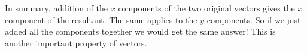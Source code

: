           
          
          \label{m38819*id194071}\nopagebreak\noindent{}
    
          
          
        \par 
        \label{m38819*id194227}In summary, addition of the \begin{math}x\end{math} components of the two original
vectors gives the \begin{math}x\end{math} component of the resultant. The same applies to
the \begin{math}y\end{math} components. So if we just added all the components
together we would get the same answer! This is another important
property of vectors.\par 
        
